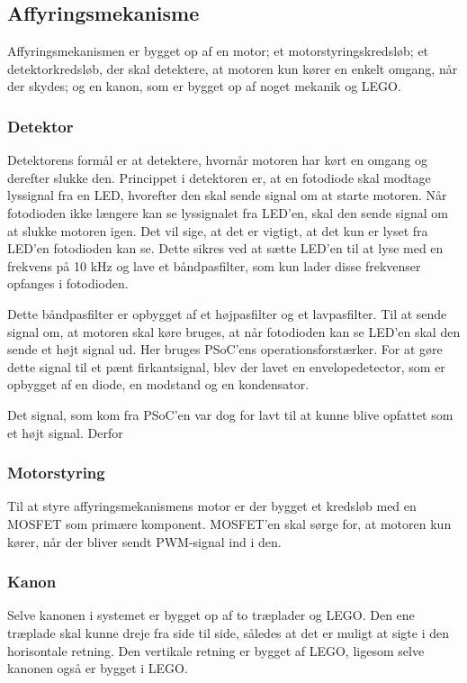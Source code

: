 \subsection{Affyringsmekanisme}
Affyringsmekanismen er bygget op af en motor; et motorstyringskredsløb; et detektorkredsløb, der skal detektere, at motoren kun kører en enkelt omgang, når der skydes; og en kanon, som er bygget op af noget mekanik og LEGO. 

\subsubsection{Detektor}
Detektorens formål er at detektere, hvornår motoren har kørt en omgang og derefter slukke den. Princippet i detektoren er, at en fotodiode skal modtage lyssignal fra en LED, hvorefter den skal sende signal om at starte motoren. Når fotodioden ikke længere kan se lyssignalet fra LED'en, skal den sende signal om at slukke motoren igen. Det vil sige, at det er vigtigt, at det kun er lyset fra LED'en fotodioden kan se. Dette sikres ved at sætte LED'en til at lyse med en frekvens på 10 kHz og lave et båndpasfilter, som kun lader disse frekvenser opfanges i fotodioden. 

Dette båndpasfilter er opbygget af et højpasfilter og et lavpasfilter. Til at sende signal om, at motoren skal køre bruges, at når fotodioden kan se LED'en skal den sende et højt signal ud. Her bruges PSoC'ens operationsforstærker. For at gøre dette signal til et pænt firkantsignal, blev der lavet en envelopedetector, som er opbygget af en diode, en modstand og en kondensator. 

Det signal, som kom fra PSoC'en var dog for lavt til at kunne blive opfattet som et højt signal. Derfor 

\subsubsection{Motorstyring}
Til at styre affyringsmekanismens motor er der bygget et kredsløb med en MOSFET som primære komponent. MOSFET'en skal sørge for, at motoren kun kører, når der bliver sendt PWM-signal ind i den. 


\subsubsection{Kanon}
Selve kanonen i systemet er bygget op af to træplader og LEGO. Den ene træplade skal kunne dreje fra side til side, således at det er muligt at sigte i den horisontale retning. Den vertikale retning er bygget af LEGO, ligesom selve kanonen også er bygget i LEGO. 

